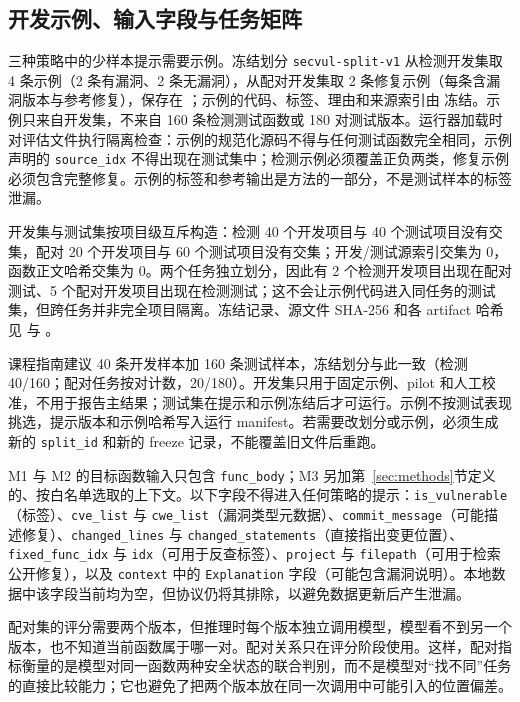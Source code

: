 \documentclass[conference]{IEEEtran}
\begin{document}
\subsection{开发示例、输入字段与任务矩阵}
三种策略中的少样本提示需要示例。冻结划分 \texttt{secvul-split-v1} 从检测开发集取 4 条示例（2 条有漏洞、2 条无漏洞），从配对开发集取 2 条修复示例（每条含漏洞版本与参考修复），保存在 ；示例的代码、标签、理由和来源索引由  冻结。示例只来自开发集，不来自 160 条检测测试函数或 180 对测试版本。运行器加载时对评估文件执行隔离检查：示例的规范化源码不得与任何测试函数完全相同，示例声明的 \texttt{source\_idx} 不得出现在测试集中；检测示例必须覆盖正负两类，修复示例必须包含完整修复。示例的标签和参考输出是方法的一部分，不是测试样本的标签泄漏。

开发集与测试集按项目级互斥构造：检测 40 个开发项目与 40 个测试项目没有交集，配对 20 个开发项目与 60 个测试项目没有交集；开发/测试源索引交集为 0，函数正文哈希交集为 0。两个任务独立划分，因此有 2 个检测开发项目出现在配对测试、5 个配对开发项目出现在检测测试；这不会让示例代码进入同任务的测试集，但跨任务并非完全项目隔离。冻结记录、源文件 SHA-256 和各 artifact 哈希见  与 。

课程指南建议 40 条开发样本加 160 条测试样本，冻结划分与此一致（检测 40/160；配对任务按对计数，20/180）。开发集只用于固定示例、pilot 和人工校准，不用于报告主结果；测试集在提示和示例冻结后才可运行。示例不按测试表现挑选，提示版本和示例哈希写入运行 manifest。若需要改划分或示例，必须生成新的 \texttt{split\_id} 和新的 freeze 记录，不能覆盖旧文件后重跑。

M1 与 M2 的目标函数输入只包含 \texttt{func\_body}；M3 另加第~\ref{sec:methods}节定义的、按白名单选取的上下文。以下字段不得进入任何策略的提示：\texttt{is\_vulnerable}（标签）、\texttt{cve\_list} 与 \texttt{cwe\_list}（漏洞类型元数据）、\texttt{commit\_message}（可能描述修复）、\texttt{changed\_lines} 与 \texttt{changed\_statements}（直接指出变更位置）、\texttt{fixed\_func\_idx} 与 \texttt{idx}（可用于反查标签）、\texttt{project} 与 \texttt{filepath}（可用于检索公开修复），以及 \texttt{context} 中的 \texttt{Explanation} 字段（可能包含漏洞说明）。本地数据中该字段当前均为空，但协议仍将其排除，以避免数据更新后产生泄漏。

配对集的评分需要两个版本，但推理时每个版本独立调用模型，模型看不到另一个版本，也不知道当前函数属于哪一对。配对关系只在评分阶段使用。这样，配对指标衡量的是模型对同一函数两种安全状态的联合判别，而不是模型对“找不同”任务的直接比较能力；它也避免了把两个版本放在同一次调用中可能引入的位置偏差。
\end{document}
